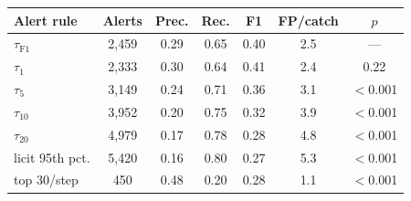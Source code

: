 \begin{tabular}{@{}lcccccc@{}}
\toprule
Alert rule & Alerts & Prec. & Rec. & F1 & FP/catch & $p$ \\
\midrule
$\tau_{\mathrm{F1}}$ & 2,459 & 0.29 & 0.65 & 0.40 & 2.5 & --- \\
$\tau_1$ & 2,333 & 0.30 & 0.64 & 0.41 & 2.4 & 0.22 \\
$\tau_5$ & 3,149 & 0.24 & 0.71 & 0.36 & 3.1 & $<$0.001 \\
$\tau_{10}$ & 3,952 & 0.20 & 0.75 & 0.32 & 3.9 & $<$0.001 \\
$\tau_{20}$ & 4,979 & 0.17 & 0.78 & 0.28 & 4.8 & $<$0.001 \\
licit 95th pct. & 5,420 & 0.16 & 0.80 & 0.27 & 5.3 & $<$0.001 \\
top 30/step & 450 & 0.48 & 0.20 & 0.28 & 1.1 & $<$0.001 \\
\bottomrule
\end{tabular}
